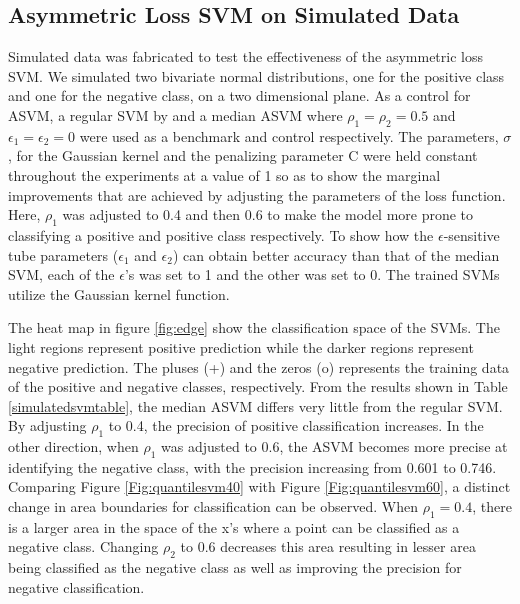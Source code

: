 \documentclass[twoside,11pt]{article}
\begin{document}
\subsection{Asymmetric Loss SVM on Simulated Data}\label{simulation}
Simulated data was fabricated to test the effectiveness of the asymmetric loss SVM. We simulated two bivariate normal distributions, one for the positive class and one for the negative class, on a two dimensional plane. As a control for ASVM, a regular SVM by \citet{Vapnik98} and a median ASVM where $\rho_1=\rho_2=0.5$ and $\epsilon_1=\epsilon_2=0$ were used as a benchmark and control respectively. The parameters, $\sigma$, for the Gaussian kernel and the penalizing parameter C were held constant throughout the experiments at a value of 1 so as to show the marginal improvements that are achieved by adjusting the parameters of the loss function. Here, $\rho_1$ was adjusted to 0.4 and then 0.6 to make the model more prone to classifying a positive and positive class respectively. To show how the $\epsilon$-sensitive tube parameters ($\epsilon_1$ and $\epsilon_2$) can obtain better accuracy than that of the median SVM, each of the $\epsilon$'s was set to 1 and the other was set to 0. The trained SVMs utilize the Gaussian kernel function. 

The heat map in figure \ref{fig:edge} show the classification space of the SVMs. The light regions represent positive prediction while the darker regions represent negative prediction. The pluses (+) and the zeros (o) represents the training data of the positive and negative classes, respectively. From the results shown in Table \ref{simulatedsvmtable}, the median ASVM differs very little from the regular SVM. By adjusting $\rho_1$ to 0.4, the precision of positive classification increases. In the other direction, when $\rho_1$ was adjusted to 0.6, the ASVM becomes more precise at identifying the negative class, with the precision increasing from 0.601 to 0.746. Comparing Figure \ref{Fig:quantilesvm40} with Figure \ref{Fig:quantilesvm60}, a distinct change in area boundaries for classification can be observed. When $\rho_1=0.4$, there is a larger area in the space of the x's where a point can be classified as a negative class. Changing $\rho_2$ to 0.6 decreases this area resulting in lesser area being classified as the negative class as well as improving the precision for negative classification.
\end{document}
